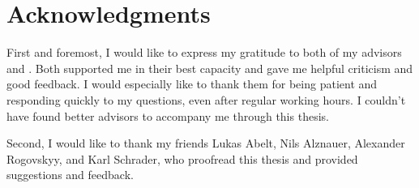 
\bigskip

\begingroup
\let\clearpage\relax
\let\cleardoublepage\relax
\let\cleardoublepage\relax
\chapter*{Acknowledgments}
First and foremost, I would like to express my gratitude to both of my advisors {\myAdvisor} and {\myOtherAdvisor}. 
Both supported me in their best capacity and gave me helpful criticism and good feedback. 
I would especially like to thank them for being patient and responding quickly to my questions, even after regular working hours.
I couldn't have found better advisors to accompany me through this thesis.

Second, I would like to thank my friends Lukas Abelt, Nils Alznauer, Alexander Rogovskyy, and Karl Schrader,
who proofread this thesis and provided suggestions and feedback.



\bigskip

\endgroup
